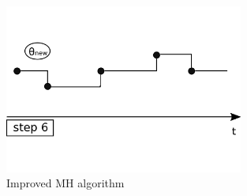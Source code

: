 \begin{figure}[H]
\begin{minipage}[hp]{0.45\linewidth}
    \vspace{-0 in}
  \end{minipage}
  \begin{minipage}[hp]{0.45\linewidth}
  \centering
    \includegraphics [width=0.70\textwidth, angle=0]{figs/plot6.pdf}
    \vspace{-0 in}
  \end{minipage}

    \caption{Improved MH algorithm}

  \end{figure}

